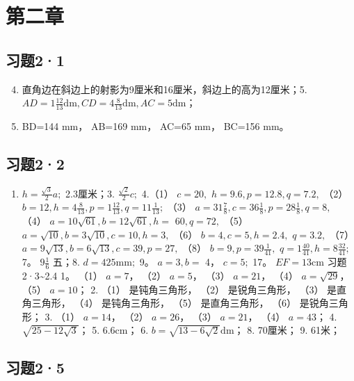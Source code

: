 \section{第二章}

\subsection{习题2·1}

\begin{enumerate}
\setcounter{enumi}{3}
\item
  直角边在斜边上的射影为9厘米和16厘米，斜边上的高为12厘米；5.
  \(AD = 1\frac{12}{13}\mathrm{dm}, CD = 4\frac{8}{13}\mathrm{dm}, AC = 5\mathrm{dm}\)；
\item
  BD=144 mm， AB=169 mm， AC=65 mm， BC=156 mm。
\end{enumerate}

\subsection{习题2·2}

\begin{enumerate}
\item
  \(h = \frac{\sqrt{3}}{2} a;\) 2.3厘米；3. \(\frac{\sqrt{2}}{2} c;\)
  4.（1） \(c = 20,\) \(h = 9.6, p = 12.8, q = 7.2,\) （2）
  \(b = 12, h = 4\frac{8}{13}, p = 1\frac{12}{13}, q = 11\frac{1}{13};\)
  （3）
  \(a = 31\frac{7}{8}, c = 36\frac{1}{8}, p = 28\frac{1}{8}, q = 8,\)
  （4） \(a = 10\sqrt{61}, b = 12\sqrt{61}, h =\) \(60, q = 72,\) （5）
  \(a = \sqrt{10}, b = 3\sqrt{10}, c = 10, h = 3,\) （6）
  \(b = 4, c = 5, h = 2.4,\) \(q = 3.2,\) （7）
  \(a = 9\sqrt{13}, b = 6\sqrt{13}, c = 39, p = 27,\) （8）
  \(b = 9, p = 39\frac{1}{41},\)
  \(q = 1\frac{40}{41}, h = 8\frac{32}{41};\) 7。 \(9\frac{1}{6}\)
  五；8. \(d = 425\mathrm{mm};\) 9。 \(a = 3, b =\) 4， \(c = 5;\) 17。
  \(E F = 13\mathrm{cm}\) 习题2·3\textasciitilde2.4 1。 （1）
  \(a = 7\)， （2） \(a = 5\)， （3） \(a = 21\)， （4）
  \(a = \sqrt{29}\)， （5） \(a = 10\)； 2. （1） 是钝角三角形， （2）
  是锐角三角形， （3） 是直角三角形， （4） 是钝角三角形， （5）
  是直角三角形， （6） 是锐角三角形； 3. （1） \(a = 14\)， （2）
  \(a = 26\)， （3） \(a = 21\)， （4） \(a = 43\)； 4.
  \(\sqrt{25 - 12\sqrt{3}}\)； 5. \(6.6\mathrm{cm}\)； 6.
  \(b = \sqrt{13 - 6\sqrt{2}}\mathrm{dm}\)； 8. 70厘米； 9. 61米；
\end{enumerate}

\subsection{习题2·5}


